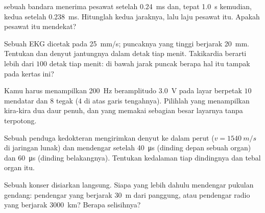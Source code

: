 \begin{exercise}[$\star\star$]\label{exo:g10:signals-and-waves:7}
 sebuah bandara menerima  pesawat setelah \qty{0.24}{ms} dan,
tepat \qty{1.0}{s} kemudian,  kedua setelah \qty{0.238}{ms}.
Hitunglah kedua jaraknya, lalu laju pesawat itu. Apakah pesawat itu
mendekat?
\end{exercise}

\begin{exercise}[$\star\star$]\label{exo:g10:signals-and-waves:8}
Sebuah EKG dicetak pada \qty{25}{mm/s}; puncaknya yang tinggi berjarak
\qty{20}{mm}. Tentukan  dan denyut jantungnya dalam detak tiap
menit. Takikardia berarti lebih dari $100$ detak tiap menit: di bawah
jarak puncak berapa hal itu tampak pada kertas ini?
\end{exercise}

\begin{exercise}[$\star\star$]\label{exo:g10:signals-and-waves:9}
Kamu harus menampilkan  \qty{200}{Hz} beramplitudo \qty{3.0}{V}
pada layar berpetak $10$ mendatar dan $8$ tegak ($4$ di atas garis
tengahnya). Pilihlah  yang menampilkan kira-kira dua daur
penuh, dan  yang memakai sebagian besar layarnya tanpa
terpotong.
\end{exercise}

\begin{exercise}[$\star\star$]\label{exo:g10:signals-and-waves:10}
Sebuah penduga kedokteran mengirimkan denyut  ke dalam perut
($v = \qty{1540}{m/s}$ di jaringan lunak) dan mendengar  setelah
\qty{40}{\micro s} (dinding depan sebuah organ) dan \qty{60}{\micro s}
(dinding belakangnya). Tentukan kedalaman tiap dindingnya dan tebal
organ itu.
\end{exercise}

\begin{exercise}[$\star\star$]\label{exo:g10:signals-and-waves:11}
Sebuah konser disiarkan langsung. Siapa yang lebih dahulu mendengar
pukulan gendang: pendengar yang berjarak \qty{30}{m} dari panggung, atau
pendengar radio yang berjarak \qty{3000}{km}? Berapa selisihnya?
\end{exercise}

